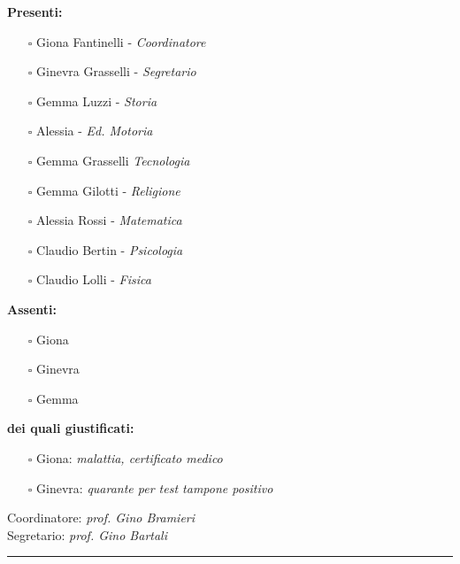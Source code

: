 \documentclass[11pt, a4paper]{exam}
\begin{document}
\vfill
{\bf Presenti:}
\begin{multicols}{2}

\begin{itemize}
	\item [$\square$]Giona Fantinelli - \em Coordinatore
	\item [$\square$]Ginevra Grasselli - \em Segretario
	\item [$\square$]Gemma Luzzi - \em Storia
	\item [$\square$]Alessia - \em Ed. Motoria
	\item [$\square$]Gemma Grasselli \em Tecnologia
	\item [$\square$]Gemma Gilotti - \em Religione
	\item [$\square$]Alessia Rossi - \em Matematica
	\item [$\square$]Claudio Bertin - \em Psicologia
	\item [$\square$]Claudio Lolli - \em Fisica
\end{itemize}

\end{multicols}
{\bf Assenti:}\\
\begin{itemize}
  \item [$\square$]Giona
  \item [$\square$]Ginevra
  \item [$\square$]Gemma
\end{itemize}
\vspace{12pt}
{\bf dei quali giustificati:}\\[8pt]
\begin{itemize}
  \item [$\square$]Giona: {\em malattia, certificato medico}
  \item [$\square$]Ginevra: {\em quarante per test tampone positivo}
\end{itemize}

\begin{center}
\begin{multicols}{2}
	Coordinatore: {\em prof. Gino Bramieri}\\
	Segretario: {\em prof. Gino Bartali}\\ 
	\end{multicols}
\end{center}
\par\noindent\rule{\textwidth}{0.2pt}\\
\end{document}
